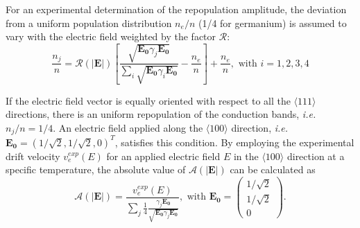 For an experimental determination of the repopulation amplitude, the deviation from a uniform population distribution $n_{e}/n$ (1/4 for germanium) is assumed to vary with the electric field weighted by the factor $\mathcal{R}$:
\begin{equation}
  \label{eq:nion}
  \frac{n_{j}}{n} = \mathcal{R(|\mathbf{E}|)}   \left[         \frac{\sqrt{\mathbf{E_{0}}\gamma_{j}\mathbf{E_{0}}}}
    {\sum_{i}\sqrt{\mathbf{E_{0}}\gamma_{i}\mathbf{E_{0}}}} -               \frac{n_{e}}{n} \right] + \frac{n_{e}}{n},  \mbox{ with }           i=1,2,3,4
\end{equation}

If the electric field vector is equally oriented with respect to all the $\langle111\rangle$ directions, there is an uniform repopulation of the conduction bands, \textit{i.e.} $n_{j}/n = 1/4$. An electric field applied along the $\langle100\rangle$ direction, \textit{i.e.} $\mathbf{E_{0}} = (1/\sqrt{2},1/\sqrt{2},0)^{T}$, satisfies this condition. By employing the experimental drift velocity $v_{e}^{exp}(E)$ for an applied electric field $E$ in the $\langle100\rangle$ direction at a specific temperature, the absolute value  of $\mathcal{A}(|\mathbf{E}|)$ can be calculated as
\begin{equation}
  \label{eq:ae}
  \mathcal{A}(|\mathbf{E}|) = \frac{v_{e}^{exp}(E)}  {\displaystyle \sum_{j}     \frac{1}{4}     \frac{\gamma_{j}\mathbf{E_{0}}}         {\sqrt{\mathbf{E_{0}}\gamma_{j}\mathbf{E_{0}}}} },  \mbox{ with }       \mathbf{E_{0}} = \left( \begin{array}{c} 
    1/\sqrt{2}\\1/\sqrt{2}\\0 \end{array} \right).
\end{equation}


